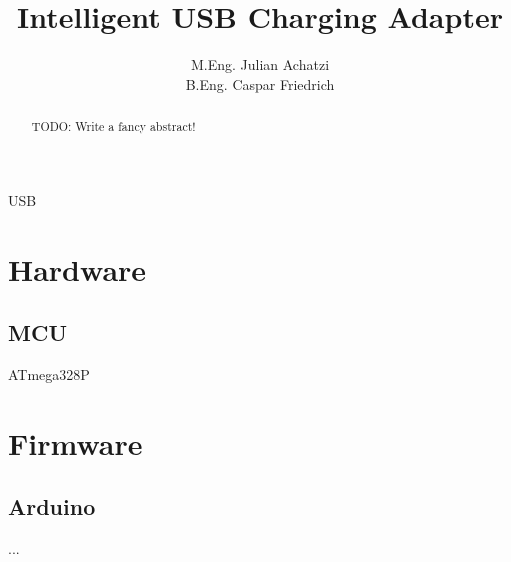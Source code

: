 \documentclass[a4paper, draft]{IEEEtran}
\author{M.Eng. Julian Achatzi \\ B.Eng. Caspar Friedrich}
\title{Intelligent USB Charging Adapter}
\begin{document}
\maketitle
\tableofcontents
\newpage


\begin{abstract}
	TODO: Write a fancy abstract!
\end{abstract}

\begin{IEEEkeywords}
	USB
\end{IEEEkeywords}


\section{Hardware}

\subsection{MCU}

ATmega328P


\section{Firmware}

\subsection{Arduino}

...
\end{document}
